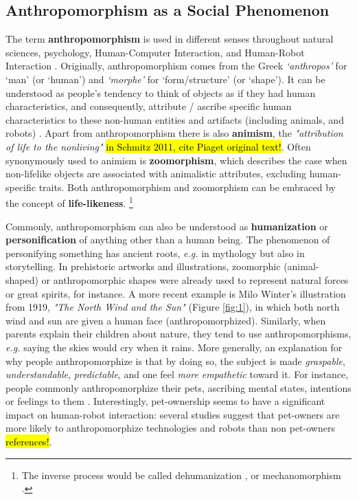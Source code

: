 \documentclass{frontiersSCNS} %
\begin{document}
\subsection*{Anthropomorphism as a Social Phenomenon}
\label{sec:social-phenomenon}

The term \textbf{anthropomorphism} is used in different senses throughout
natural sciences, psychology, Human-Computer Interaction, and Human-Robot
Interaction \cite{duffy_anthropomorphism_2003}. Originally, anthropomorphism
comes from the Greek \textit{`anthropos'} for `man' (or `human') and
\textit{`morphe'} for `form/structure' (or `shape'). It can be understood as
people's tendency to think of objects as if they had human characteristics, and
consequently, attribute / ascribe specific human characteristics to these
non-human entities and artifacts (including animals, and robots)
\cite{duffy_anthropomorphism_2003,schmitz_concepts_2011}. Apart from
anthropomorphism there is also \textbf{animism}, the \textit{"attribution of
life to the nonliving"} \hl{in Schmitz 2011, cite Piaget original text!}. Often
synonymously used to animism is \textbf{zoomorphism}, which describes the case
when non-lifelike objects are associated with animalistic attributes, excluding
human-specific traits. Both anthropomorphism and zoomorphism can be embraced by
the concept of \textbf{life-likeness}. \footnote{The inverse process would be
called dehumanization \cite{haslam_dehumanization:_2006}, or mechanomorphism
\cite{caporael_anthropomorphism_1986}.}
		
Commonly, anthropomorphism can also be understood as \textbf{humanization} or
\textbf{personification} of anything other than a human being. The phenomenon of
personifying something has ancient roots, \textit{e.g.} in mythology but also in
storytelling. In prehistoric artworks and illustrations, zoomorphic
(animal-shaped) or anthropomorphic shapes were already used to represent natural
forces or great spirits, for instance. A more recent example is Milo Winter's
illustration from 1919, \textit{"The North Wind and the Sun"} (Figure
\ref{fig:1}), in which both north wind and sun are given a human face
(anthropomorphized). Similarly, when parents explain their children about
nature, they tend to use anthropomorphisms, \textit{e.g.} saying the skies would
cry when it rains. More generally, an explanation for why people
anthropomorphize is that by doing so, the subject is made \emph{graspable},
\emph{understandable}, \emph{predictable}, and one feel \emph{more empathetic}
toward it. For instance, people commonly anthropomorphize their pets,
ascribing mental states, intentions or feelings to them
\cite{eddy_attribution_1993}. Interestingly, pet-ownership seems to have a
significant impact on human-robot interaction: several studies suggest that
pet-owners are more likely to anthropomorphize technologies and robots than non
pet-owners \hl{references!}.
\end{document}
